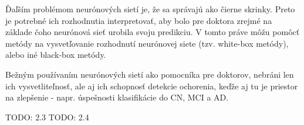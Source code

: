 Ďaľším problémom neurónových sietí je, že sa správajú ako čierne skrinky. Preto je potrebné ich rozhodnutia interpretovať, aby bolo pre doktora zrejmé na základe čoho neurónová sieť urobila svoju predikciu. V tomto práve môžu pomôcť metódy na vysvetľovanie rozhodnutí neurónovej siete (tzv. white-box metódy), alebo iné black-box metódy.

Bežným používaním neurónových sietí ako pomocníka pre doktorov, nebráni len ich vysvetliteľnosť, ale aj ich schopnosť detekcie ochorenia, keďže aj tu je priestor na zlepšenie - napr. úspešnosti klasifikácie do CN, MCI a AD.

TODO: 2.3
TODO: 2.4

